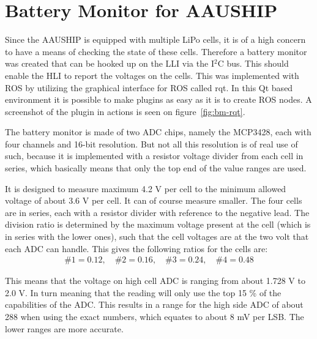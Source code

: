 \chapter{Battery Monitor for AAUSHIP}
\label{ch:bm}


Since the AAUSHIP is equipped with multiple LiPo cells, it is of
a high concern to have a means of checking the state of these cells.
Therefore a battery monitor was created that can be hooked up on the
\ac{LLI} via the I$^2$C bus. This should enable the \ac{HLI} to report
the voltages on the cells. This was implemented with \ac{ROS} by
utilizing the graphical interface for \ac{ROS} called rqt. In this Qt
based environment it is possible to make plugins as easy as it is to
create \ac{ROS} nodes. A screenshot of the plugin in actions is seen
on figure~\vref{fig:bm-rqt}.

The battery monitor is made of two \ac{ADC} chips, namely the MCP3428,
each with four channels and 16-bit resolution. But not all this
resolution is of real use of such, because it is implemented with a
resistor voltage divider from each cell in series, which basically
means that only the top end of the value ranges are used. 

It is designed to measure maximum 4.2 V per cell to the minimum
allowed voltage of about 3.6 V per cell. It can of course measure
smaller. The four cells are in series, each with a resistor divider with
reference to the negative lead. The division ratio is determined by
the maximum voltage present at the cell (which is in series with the
lower ones), such that the cell voltages are at the two volt that
each \ac{ADC} can handle. This gives the following ratios for the
cells are:
\begin{align}
	\#1 = 0.12, \quad \#2 = 0.16, \quad \#3 = 0.24, \quad \#4 = 0.48
\end{align}

This means that the voltage on high cell \ac{ADC} is ranging from
about 1.728 V to 2.0 V. In turn meaning that the reading will only use
the top  15 \% of the capabilities of the \ac{ADC}. This results in a
range for the high side \ac{ADC} of about 288 when using the exact
numbers, which equates to about 8 mV per \ac{LSB}. The lower ranges
are more accurate.

